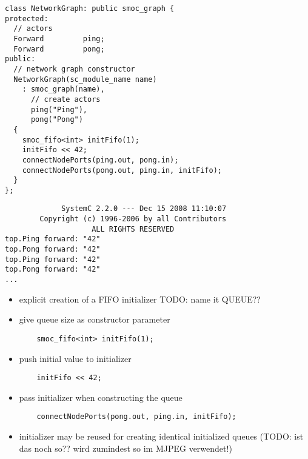 \begin{frame}[fragile=singleslide]
\begin{lstlisting}
class NetworkGraph: public smoc_graph {
protected:
  // actors
  Forward         ping;
  Forward         pong;
public:
  // network graph constructor
  NetworkGraph(sc_module_name name)
    : smoc_graph(name),
      // create actors
      ping("Ping"),
      pong("Pong")
  {
    smoc_fifo<int> initFifo(1);
    initFifo << 42;
    connectNodePorts(ping.out, pong.in);
    connectNodePorts(pong.out, ping.in, initFifo);
  }
};
\end{lstlisting}
\end{frame}





\begin{frame}[fragile=singleslide]
\begin{lstlisting}
             SystemC 2.2.0 --- Dec 15 2008 11:10:07
        Copyright (c) 1996-2006 by all Contributors
                    ALL RIGHTS RESERVED
top.Ping forward: "42"
top.Pong forward: "42"
top.Ping forward: "42"
top.Pong forward: "42"
...
\end{lstlisting}
\end{frame}

\begin{frame}[fragile=singleslide]
\begin{itemize}
\item explicit creation of a FIFO initializer TODO: name it QUEUE??
\item give queue size as constructor parameter
\begin{lstlisting}
    smoc_fifo<int> initFifo(1);
\end{lstlisting}
\item push initial value to initializer
\begin{lstlisting}
    initFifo << 42;
\end{lstlisting}
\item pass initializer when constructing the queue
\begin{lstlisting}
    connectNodePorts(pong.out, ping.in, initFifo);
\end{lstlisting}
\item initializer may be reused for creating identical initialized queues (TODO: ist das noch so?? wird zumindest so im MJPEG verwendet!)
\end{itemize}
\end{frame}


